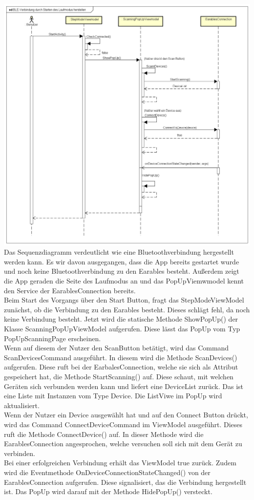 \documentclass[a4paper,12pt]{article}
\begin{document}
\includegraphics[width=1.1\textwidth]{./Diagramme/Verbindungsaufbausequenzdiagramm.png}\\
Das Sequenzdiagramm verdeutlicht wie eine Bluetoothverbindung hergestellt werden kann. Es wir davon ausgegangen, dass die App bereits gestartet wurde und noch keine Bluetoothverbindung zu den Earables besteht. Außerdem zeigt die App geraden die Seite des Laufmodus an und das PopUpViemwmodel kennt den Service der EarablesConnection bereits.\\
Beim Start des Vorgangs über den Start Button, fragt das StepModeViewModel zunächst, ob die Verbindung zu den \gls{Earables} besteht. Dieses schlägt fehl, da noch keine Verbindung besteht.
Jetzt wird die statische Methode ShowPopUp() der Klasse ScanningPopUpViewModel aufgerufen. Diese lässt das PopUp vom Typ PopUpScanningPage erscheinen.\\
Wenn auf diesem der Nutzer den ScanButton betätigt, wird das Command ScanDevicesCommand ausgeführt. In diesem wird die Methode ScanDevices() aufgerufen. Diese ruft bei der EarbalesConnection, welche sie sich als Attribut gespeichert hat, die Methode StartScanning() auf. 
Diese schaut, mit welchen Geräten sich verbunden werden kann und liefert eine DeviceList zurück. Das ist eine Liste mit Instanzen vom Type Device.
Die ListViwe im PopUp wird aktualisiert.\\
Wenn der Nutzer ein Device ausgewählt hat und auf den Connect Button drückt, wird das Command ConnectDeviceCommand im ViewModel ausgeführt. Dieses ruft die Methode ConnectDevice() auf. In dieser Methode wird die EarablesConnection angesprochen, welche versuchen soll sich mit dem Gerät zu verbinden.\\
Bei einer erfolgreichen Verbindung erhält das ViewModel true zurück. Zudem wird die Eventmethode OnDeviceConnectionStateChanged() von der EarablesConnection aufgerufen. Diese signalisiert, das die Verbindung hergestellt ist. Das PopUp wird darauf mit der Methode HidePopUp() versteckt.
\end{document}
